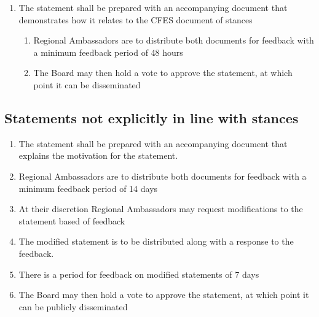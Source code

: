 \begin{enumerate}
 \item
  The statement shall be prepared with an accompanying document that demonstrates how it relates to the CFES document of stances

  \begin{enumerate}
   \item
    Regional Ambassadors are to distribute both documents for feedback with a minimum feedback period of 48 hours
   \item
    The Board may then hold a vote to approve the statement, at which point it can be disseminated
  \end{enumerate}
\end{enumerate}

\subsection{Statements not explicitly in line with stances}
\label{statements-not-explicitly-in-line-with-stances}

\begin{enumerate}
 \item
  The statement shall be prepared with an accompanying document that explains the motivation for the statement.
 \item
  Regional Ambassadors are to distribute both documents for feedback with a minimum feedback period of 14 days
 \item
  At their discretion Regional Ambassadors may request modifications to the statement based of feedback
 \item
  The modified statement is to be distributed along with a response to the feedback.
 \item
  There is a period for feedback on modified statements of 7 days
 \item
  The Board may then hold a vote to approve the statement, at which point it can be publicly disseminated
\end{enumerate}

